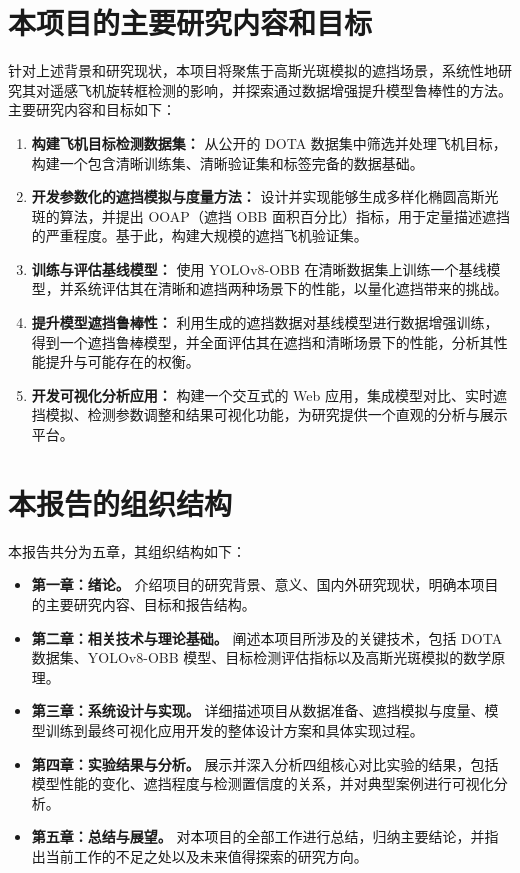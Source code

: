 \documentclass[12pt, a4paper]{report}
\begin{document}
\section{本项目的主要研究内容和目标}
针对上述背景和研究现状，本项目将聚焦于高斯光斑模拟的遮挡场景，系统性地研究其对遥感飞机旋转框检测的影响，并探索通过数据增强提升模型鲁棒性的方法。主要研究内容和目标如下：
\begin{enumerate}
    \item \textbf{构建飞机目标检测数据集：} 从公开的 DOTA 数据集中筛选并处理飞机目标，构建一个包含清晰训练集、清晰验证集和标签完备的数据基础。
    \item \textbf{开发参数化的遮挡模拟与度量方法：} 设计并实现能够生成多样化椭圆高斯光斑的算法，并提出 OOAP（遮挡 OBB 面积百分比）指标，用于定量描述遮挡的严重程度。基于此，构建大规模的遮挡飞机验证集。
    \item \textbf{训练与评估基线模型：} 使用 YOLOv8-OBB 在清晰数据集上训练一个基线模型，并系统评估其在清晰和遮挡两种场景下的性能，以量化遮挡带来的挑战。
    \item \textbf{提升模型遮挡鲁棒性：} 利用生成的遮挡数据对基线模型进行数据增强训练，得到一个遮挡鲁棒模型，并全面评估其在遮挡和清晰场景下的性能，分析其性能提升与可能存在的权衡。
    \item \textbf{开发可视化分析应用：} 构建一个交互式的 Web 应用，集成模型对比、实时遮挡模拟、检测参数调整和结果可视化功能，为研究提供一个直观的分析与展示平台。
\end{enumerate}

\section{本报告的组织结构}
本报告共分为五章，其组织结构如下：
\begin{itemize}
    \item \textbf{第一章：绪论。} 介绍项目的研究背景、意义、国内外研究现状，明确本项目的主要研究内容、目标和报告结构。
    \item \textbf{第二章：相关技术与理论基础。} 阐述本项目所涉及的关键技术，包括 DOTA 数据集、YOLOv8-OBB 模型、目标检测评估指标以及高斯光斑模拟的数学原理。
    \item \textbf{第三章：系统设计与实现。} 详细描述项目从数据准备、遮挡模拟与度量、模型训练到最终可视化应用开发的整体设计方案和具体实现过程。
    \item \textbf{第四章：实验结果与分析。} 展示并深入分析四组核心对比实验的结果，包括模型性能的变化、遮挡程度与检测置信度的关系，并对典型案例进行可视化分析。
    \item \textbf{第五章：总结与展望。} 对本项目的全部工作进行总结，归纳主要结论，并指出当前工作的不足之处以及未来值得探索的研究方向。
\end{itemize}
\end{document}
